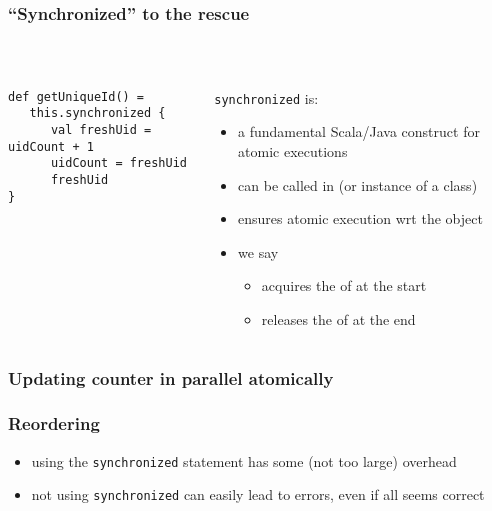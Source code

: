 \documentclass[aspectratio=169]{beamer}
\begin{document}
\begin{frame}[fragile]\frametitle{``Synchronized'' to the rescue}
~\\[-8mm]
\begin{columns}
\begin{column}{0.49\textwidth}
\begin{lstlisting}[emph={printUniqueIds,sleep,log,thread,join}]
def getUniqueId() =
   this.synchronized {
      val freshUid = uidCount + 1
      uidCount = freshUid
      freshUid
}
\end{lstlisting}
\end{column}
\begin{column}{0.49\textwidth}
\texttt{synchronized} is:
\begin{itemize}
  \item a fundamental Scala/Java construct for atomic executions
  \item can be called in  (or instance of a class)
  \item ensures atomic execution wrt the object
  \item we say 
    \begin{itemize}
      \item \alert{acquires} the  of  at the start
      \item \alert{releases} the  of  at the end
    \end{itemize}
\end{itemize}
\end{column}
\end{columns}
\end{frame}


\begin{frame}\frametitle{Updating counter in parallel atomically}
  \centering  
\end{frame}

\begin{frame}%
  \centering
\end{frame}


\begin{frame}\frametitle{Reordering}
\centering
\begin{itemize}
  \item using the \texttt{synchronized} statement has some (not too large) overhead
  \item not using \texttt{synchronized} can easily lead to errors, even if all seems correct
\end{itemize}

{\large {}}
\end{frame}
\end{document}
